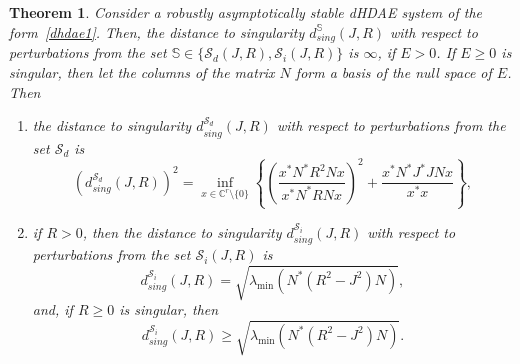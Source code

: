 \documentclass[11pt]{article}
\newtheorem{theorem}{Theorem}
\newcommand{\C}{\mathbb C}
\newcommand{\nnrm}[1]{{\left\vert\kern-0.25ex\left\vert\kern-0.25ex\left\vert #1
		\right\vert\kern-0.25ex\right\vert\kern-0.25ex\right\vert}}
\begin{document}
\begin{theorem}\label{thm:dist-singJR}
	Consider a robustly asymptotically stable dHDAE system of the form~\eqref{dhdae1}. Then, the distance to singularity $d_{sing}^{\mathbb S}(J,R)$ with respect to perturbations from the set $\mathbb S\in \{\mathcal S_d(J,R),\mathcal S_i(J,R)\}$ is $\infty$, if $E>0$. If $E\geq 0$ is singular, then let the columns of the matrix $N$ form a basis of the null space of $E$. Then
    \begin{enumerate}
        \item the distance to singularity $d_{sing}^{\mathcal S_d}(J,R)$ with respect to perturbations from the set $\mathcal S_d$ is
    	\begin{equation}\label{eq:dist-sing}
    		(d_{sing}^{\mathcal S_d}(J,R))^2=
    			\inf_{x\in \C^{r}\setminus \{0\}} \left\{\left(\frac{x^*N^*R^2Nx}{x^*N^*RNx} \right)^2+\frac{x^*N^*J^*JNx}{x^*x} \right\},
    	\end{equation}
        \item if $R>0$, then the distance to singularity $d_{sing}^{\mathcal S_i}(J,R)$ with respect to perturbations from the set $\mathcal S_i(J,R)$ is
        \begin{equation}
            d_{sing}^{\mathcal S_i}(J,R) = \sqrt{\lambda_{\min}(N^*(R^2-J^2)N)},
        \end{equation}
        and, if $R\ge 0$ is singular, then
        \begin{equation}
            d_{sing}^{\mathcal S_i}(J,R) \geq \sqrt{\lambda_{\min}(N^*(R^2-J^2)N)}.
        \end{equation}
    \end{enumerate}
\end{theorem}
\end{document}
